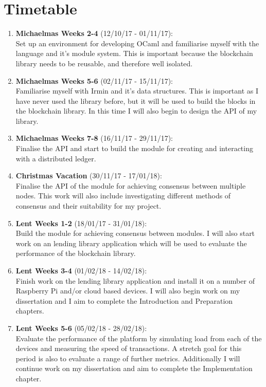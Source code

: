 \documentclass[12pt, letterpaper, twoside]{article}
\begin{document}
	\section*{Timetable}
	\begin{enumerate}
		\item \textbf{Michaelmas Weeks 2-4} (12/10/17 - 01/11/17):\\
		Set up an environment for developing OCaml and familiarise myself with the language and it's module system. This is important because the blockchain library needs to be reusable, and therefore well isolated.
		\item \textbf{Michaelmas Weeks 5-6}  (02/11/17 - 15/11/17):\\
		Familiarise myself with Irmin and it's data structures. This is important as I have never used the library before, but it will be used to build the blocks in the blockchain library. In this time I will also begin to design the API of my library.
		\item \textbf{Michaelmas Weeks 7-8} (16/11/17 - 29/11/17):\\
		Finalise the API and start to build the module for creating and interacting with a distributed ledger.
		\item \textbf{Christmas Vacation} (30/11/17 - 17/01/18):\\
		Finalise the API of the module for achieving consensus between multiple nodes. This work will also include investigating different methods of consensus and their suitability for my project.
		\item \textbf{Lent Weeks 1-2} (18/01/17 - 31/01/18):\\
		Build the module for achieving consensus between modules. I will also start work on an lending library application which will be used to evaluate the performance of the blockchain library. 
		\item \textbf{Lent Weeks 3-4} (01/02/18 - 14/02/18):
		\\
		Finish work on the lending library application and install it on a number of Raspberry Pi and/or cloud based devices. I will also begin work on my dissertation and I aim to complete the Introduction and Preparation chapters.
		\item \textbf{Lent Weeks 5-6} (05/02/18 - 28/02/18):\\
		Evaluate the performance of the platform by simulating load from each of the devices and measuring the speed of transactions. A stretch goal for this period is also to evaluate a range of further metrics. Additionally I will continue work on my dissertation and aim to complete the Implementation chapter.

\end{enumerate}
\end{document}
